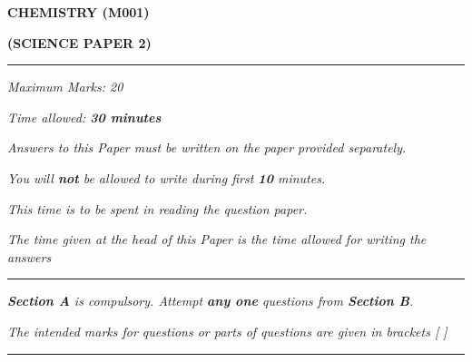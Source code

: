 \begin{center}
   \Large
   \textbf{CHEMISTRY (M001)}

   \textbf{(SCIENCE PAPER 2)}
   \rule{\textwidth}{0.4pt}
   \normalsize
   \textit{Maximum Marks: 20}

   \textit{Time allowed: \textbf{30 minutes}}

   \textit{Answers to this Paper must be written on the paper provided separately.}

   \textit{You will \textbf{not} be allowed to write during first \textbf{10} minutes.}

   \textit{This time is to be spent in reading the question paper.}

   \textit{The time given at the head of this Paper is the time allowed for writing the answers}
   \rule{\textwidth}{0.4pt}
   \small

   \textit{\textbf{Section A} is compulsory. Attempt \textbf{any one} questions from \textbf{Section B}.}

   \textit{The intended marks for questions or parts of questions are given in brackets [ ]}
   \rule{\textwidth}{0.4pt}
\end{center}
